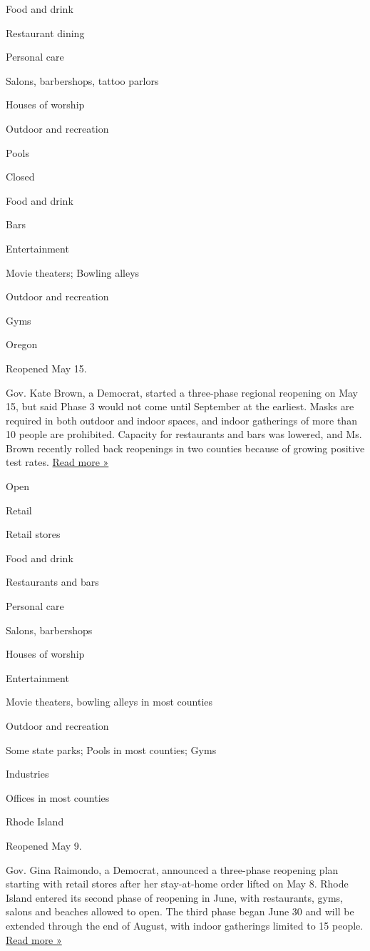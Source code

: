 Food and drink

Restaurant dining

Personal care

Salons, barbershops, tattoo parlors

Houses of worship

Outdoor and recreation

Pools

Closed

Food and drink

Bars

Entertainment

Movie theaters; Bowling alleys

Outdoor and recreation

Gyms

Oregon

Reopened May 15.

Gov. Kate Brown, a Democrat, started a three-phase regional reopening on
May 15, but said Phase 3 would not come until September at the earliest.
Masks are required in both outdoor and indoor spaces, and indoor
gatherings of more than 10 people are prohibited. Capacity for
restaurants and bars was lowered, and Ms. Brown recently rolled back
reopenings in two counties because of growing positive test rates.
\href{https://www.oregonlive.com/news/2020/07/oregon-gov-kate-brown-announces-new-mask-mandate-for-kids-earlier-bar-and-restaurant-closure-times.html}{Read
more »}

Open

Retail

Retail stores

Food and drink

Restaurants and bars

Personal care

Salons, barbershops

Houses of worship

Entertainment

Movie theaters, bowling alleys in most counties

Outdoor and recreation

Some state parks; Pools in most counties; Gyms

Industries

Offices in most counties

Rhode Island

Reopened May 9.

Gov. Gina Raimondo, a Democrat, announced a three-phase reopening plan
starting with retail stores after her stay-at-home order lifted on May
8. Rhode Island entered its second phase of reopening in June, with
restaurants, gyms, salons and beaches allowed to open. The third phase
began June 30 and will be extended through the end of August, with
indoor gatherings limited to 15 people.
\href{https://www.wpri.com/health/coronavirus/july-29-ri-coronavirus-update/}{Read
more »}

